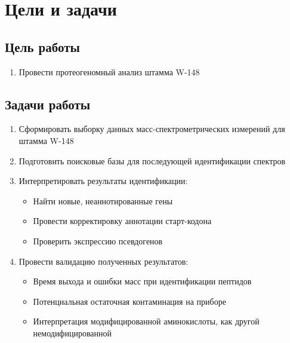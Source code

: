 \section{Цели и задачи}
\subsection{Цель работы}
\begin{enumerate} 
    \item Провести протеогеномный анализ штамма  W-148 
\end{enumerate}

\subsection{Задачи работы}

\begin{enumerate} 
    \item Сформировать выборку данных масс-спектрометрических измерений для штамма W-148
    \item Подготовить поисковые базы для последующей идентификации спектров
    \item Интерпретировать результаты идентификации:
    \begin{itemize}
        \item Найти новые, неаннотированные гены
        \item Провести корректировку аннотации старт-кодона
        \item Проверить экспрессию псевдогенов
    \end{itemize} 
    \item Провести валидацию полученных результатов:
    \begin{itemize}
        \item Время выхода и ошибки масс при идентификации пептидов
        \item Потенциальная остаточная контаминация на приборе
        \item Интерпретация модифицированной аминокислоты, как другой немодифицированной
    \end{itemize}
    
\end{enumerate}

\newpage